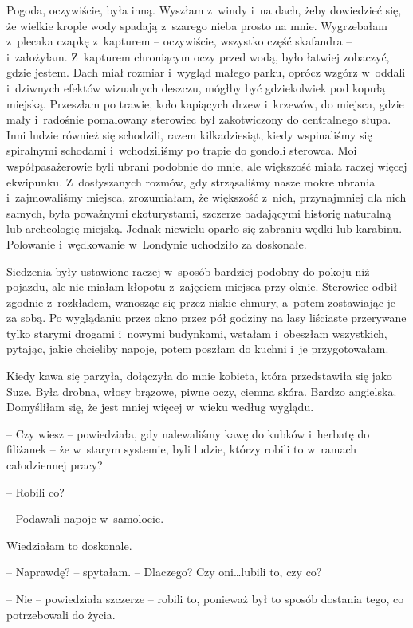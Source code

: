 \documentclass[oneside,polish,11pt,sfheadings]{mwbk}
\begin{document}
Pogoda, oczywiście, była inną. Wyszłam z~windy i~na dach, żeby
dowiedzieć się, że wielkie krople wody spadają z~szarego nieba prosto na
mnie. Wygrzebałam z~plecaka czapkę z~kapturem -- oczywiście, wszystko
część skafandra -- i~założyłam. Z~kapturem chroniącym oczy przed wodą,
było łatwiej zobaczyć, gdzie jestem. Dach miał rozmiar i~wygląd małego
parku, oprócz wzgórz w~oddali i~dziwnych efektów wizualnych deszczu,
mógłby być gdziekolwiek pod kopułą miejską. Przeszłam po trawie, koło
kapiących drzew i~krzewów, do miejsca, gdzie mały i~radośnie pomalowany
sterowiec był zakotwiczony do centralnego słupa. Inni ludzie również się
schodzili, razem kilkadziesiąt, kiedy wspinaliśmy się spiralnymi
schodami i~wchodziliśmy po trapie do gondoli sterowca. Moi
współpasażerowie byli ubrani podobnie do mnie, ale większość miała
raczej więcej ekwipunku. Z~dosłyszanych rozmów, gdy strząsaliśmy nasze
mokre ubrania i~zajmowaliśmy miejsca, zrozumiałam, że większość z~nich,
przynajmniej dla nich samych, była poważnymi ekoturystami, szczerze
badającymi historię naturalną lub archeologię miejską. Jednak niewielu
oparło się zabraniu wędki lub karabinu. Polowanie i~wędkowanie w~Londynie uchodziło za doskonałe.

Siedzenia były ustawione raczej w~sposób bardziej podobny do pokoju niż
pojazdu, ale nie miałam kłopotu z~zajęciem miejsca przy oknie. Sterowiec
odbił zgodnie z~rozkładem, wznosząc się przez niskie chmury, a~potem
zostawiając je za sobą. Po wyglądaniu przez okno przez pół godziny na
lasy liściaste przerywane tylko starymi drogami i~nowymi budynkami,
wstałam i~obeszłam wszystkich, pytając, jakie chcieliby napoje, potem
poszłam do kuchni i~je przygotowałam.

Kiedy kawa się parzyła, dołączyła do mnie kobieta, która przedstawiła
się jako Suze. Była drobna, włosy brązowe, piwne oczy, ciemna skóra.
Bardzo angielska. Domyśliłam się, że jest mniej więcej w~wieku według
wyglądu.

-- Czy wiesz -- powiedziała, gdy nalewaliśmy kawę do kubków i~herbatę do
filiżanek -- że w~starym systemie, byli ludzie, którzy robili to w~ramach
całodziennej pracy?

-- Robili co?

-- Podawali napoje w~samolocie.

Wiedziałam to doskonale.

-- Naprawdę? -- spytałam. -- Dlaczego? Czy oni\ldots  lubili to, czy co?

-- Nie -- powiedziała szczerze -- robili to, ponieważ był to sposób
dostania tego, co potrzebowali do życia.
\end{document}
